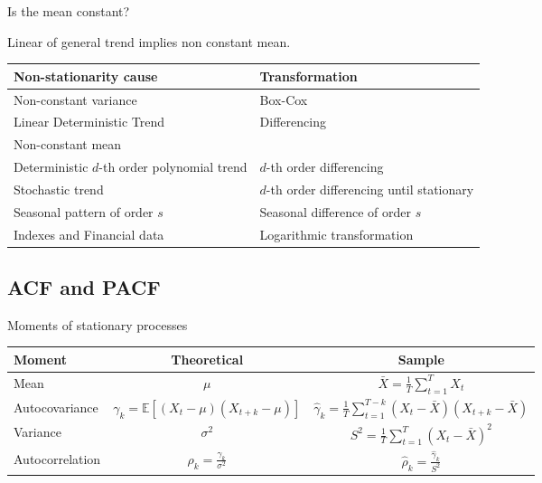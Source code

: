 Is the mean constant?

Linear of general trend implies non constant mean.

\begin{recap}{}{}
    \begin{tabular}{ll}
        \toprule
        Non-stationarity cause & Transformation \\ \midrule
        Non-constant variance & Box-Cox \\
        Linear Deterministic Trend & \multirow{2}{*}{Differencing} \\
        Non-constant mean & \\
        Deterministic $d$-th order polynomial trend & $d$-th order differencing \\
        Stochastic trend & $d$-th order differencing until stationary \\
        Seasonal pattern of order $s$ & Seasonal difference of order $s$ \\
        Indexes and Financial data & Logarithmic transformation \\
        \bottomrule
    \end{tabular}
\end{recap}

\subsection{ACF and PACF}

Moments of stationary processes

\begin{tabular}{lcc}
    \toprule
    Moment & Theoretical & Sample \\ \midrule
    Mean & $\mu$ & $\bar{X} = \frac{1}{T} \sum_{t=1}^T X_t$ \\
    Autocovariance & $\gamma_k = \mathbb{E}[(X_t - \mu)(X_{t+k} - \mu)]$ & $\hat{\gamma}_k = \frac{1}{T} \sum_{t=1}^{T-k} (X_t - \bar{X})(X_{t+k} - \bar{X})$ \\
    Variance & $\sigma^2$ & $S^2 = \frac{1}{T} \sum_{t=1}^T (X_t - \bar{X})^2$ \\
    Autocorrelation & $\rho_k = \frac{\gamma_k}{\sigma^2}$ & $\hat{\rho}_k = \frac{\hat{\gamma}_k}{S^2}$ \\
    \bottomrule
\end{tabular}
